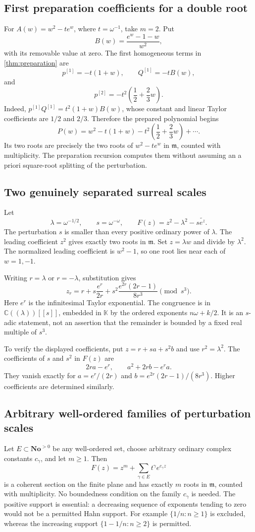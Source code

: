 \documentclass[11pt,oneside]{article}
\numberwithin{equation}{section}
\theoremstyle{definition}
\theoremstyle{remark}\newtheorem{remark}[theorem]{Remark}
\newcommand{\No}{\mathbf{No}}
\newcommand{\K}{\mathbb K}
\newcommand{\C}{\mathbb C}
\newcommand{\m}{\mathfrak m}
\begin{document}
\subsection{First preparation coefficients for a double root}
For $A(w)=w^2-t e^w$, where $t=\omega^{-1}$, take $m=2$. Put
\[
 B(w)=\frac{e^w-1-w}{w^2},
\]
with its removable value at zero. The first homogeneous terms in
\cref{thm:preparation} are
\[
 p^{[1]}=-t(1+w),\qquad Q^{[1]}=-tB(w),
\]
and
\[
 p^{[2]}=-t^2\left(\frac12+\frac23w\right).
\]
Indeed, $p^{[1]}Q^{[1]}=t^2(1+w)B(w)$, whose constant and linear Taylor
coefficients are $1/2$ and $2/3$. Therefore the prepared polynomial begins
\[
 P(w)=w^2-t(1+w)-t^2\left(\frac12+\frac23w\right)+\cdots.
\]
Its two roots are precisely the two roots of $w^2-te^w$ in $\m$,
counted with multiplicity. The preparation recursion computes them without
assuming an a priori square-root splitting of the perturbation.

\subsection{Two genuinely separated surreal scales}
Let
\[
 \lambda=\omega^{-1/2},\qquad s=\omega^{-\omega},\qquad
 F(z)=z^2-\lambda^2-s\widetilde{e^z}.
\]
The perturbation $s$ is smaller than every positive ordinary power of
$\lambda$. The leading coefficient $z^2$ gives exactly two roots in
$\m$. Set $z=\lambda w$ and divide by $\lambda^2$. The normalized leading
coefficient is $w^2-1$, so one root lies near each of $w=1,-1$.

Writing $r=\lambda$ or $r=-\lambda$, substitution gives
\begin{equation}\label{eq:two-scale}
 z_r=r+s\frac{e^r}{2r}
       +s^2\frac{e^{2r}(2r-1)}{8r^3}
       \pmod {s^3}.
\end{equation}
Here $e^r$ is the infinitesimal Taylor exponential. The congruence is in
$\C((\lambda))[[s]]$, embedded in $\K$ by the ordered exponents
$n\omega+k/2$. It is an $s$-adic statement, not an assertion that the
remainder is bounded by a fixed real multiple of $s^3$.

To verify the displayed coefficients, put $z=r+sa+s^2b$ and use
$r^2=\lambda^2$. The coefficients of $s$ and $s^2$ in $F(z)$ are
\[
 2ra-e^r,\qquad a^2+2rb-e^ra.
\]
They vanish exactly for $a=e^r/(2r)$ and
$b=e^{2r}(2r-1)/(8r^3)$. Higher coefficients are determined similarly.

\subsection{Arbitrary well-ordered families of perturbation scales}
Let $E\subset\No^{>0}$ be any well-ordered set, choose arbitrary ordinary
complex constants $c_\gamma$, and let $m\geq1$. Then
\[
 F(z)=z^m+\sum_{\gamma\in E}t^\gamma e^{c_\gamma z}
\]
is a coherent section on the finite plane and has exactly $m$ roots in
$\m$, counted with multiplicity. No boundedness condition on the family
$c_\gamma$ is needed. The positive support is essential: a decreasing
sequence of exponents tending to zero would not be a permitted Hahn
support. For example $\{1/n:n\geq1\}$ is excluded, whereas the increasing
support $\{1-1/n:n\geq2\}$ is permitted.
\end{document}
